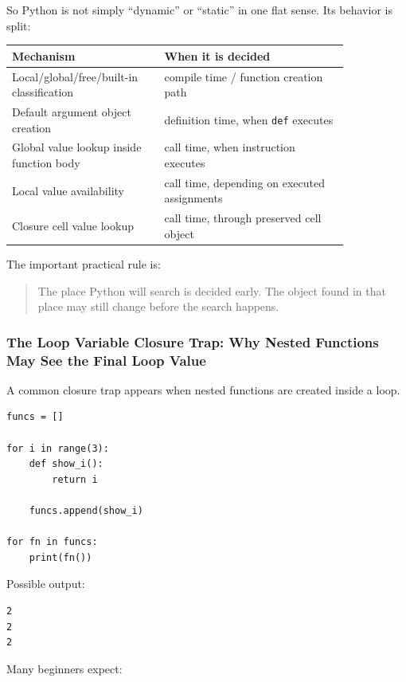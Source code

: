 So Python is not simply ``dynamic'' or ``static'' in one flat sense. Its behavior is split:

\begin{center}
\begin{tabular}{|p{0.38\linewidth}|p{0.46\linewidth}|}
\hline
\textbf{Mechanism} & \textbf{When it is decided} \\
\hline
Local/global/free/built-in classification & compile time / function creation path \\
\hline
Default argument object creation & definition time, when \texttt{def} executes \\
\hline
Global value lookup inside function body & call time, when instruction executes \\
\hline
Local value availability & call time, depending on executed assignments \\
\hline
Closure cell value lookup & call time, through preserved cell object \\
\hline
\end{tabular}
\end{center}

The important practical rule is:

\begin{quote}
The place Python will search is decided early. The object found in that place may still change before the search happens.
\end{quote}

\subsubsection{The Loop Variable Closure Trap: Why Nested Functions May See the Final Loop Value}

A common closure trap appears when nested functions are created inside a loop.

\begin{verbatim}
funcs = []

for i in range(3):
    def show_i():
        return i

    funcs.append(show_i)

for fn in funcs:
    print(fn())
\end{verbatim}

Possible output:

\begin{verbatim}
2
2
2
\end{verbatim}

Many beginners expect:

